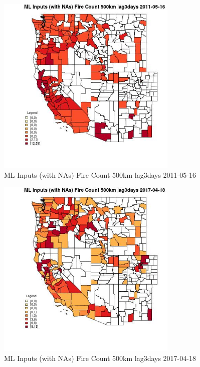 \begin{figure} 
\centering  
\includegraphics[width=0.77\textwidth]{Code_Outputs/Report_ML_input_PM25_Step4_part_e_de_duplicated_aves_compiled_2019-05-20wNAs_CountyFire_Count_500km_lag3daysMean2011-05-16.jpg} 
\caption{\label{fig:Report_ML_input_PM25_Step4_part_e_de_duplicated_aves_compiled_2019-05-20wNAsCountyFire_Count_500km_lag3daysMean2011-05-16}ML Inputs (with NAs) Fire Count 500km lag3days 2011-05-16} 
\end{figure} 
 

\begin{figure} 
\centering  
\includegraphics[width=0.77\textwidth]{Code_Outputs/Report_ML_input_PM25_Step4_part_e_de_duplicated_aves_compiled_2019-05-20wNAs_CountyFire_Count_500km_lag3daysMean2017-04-18.jpg} 
\caption{\label{fig:Report_ML_input_PM25_Step4_part_e_de_duplicated_aves_compiled_2019-05-20wNAsCountyFire_Count_500km_lag3daysMean2017-04-18}ML Inputs (with NAs) Fire Count 500km lag3days 2017-04-18} 
\end{figure} 
 

